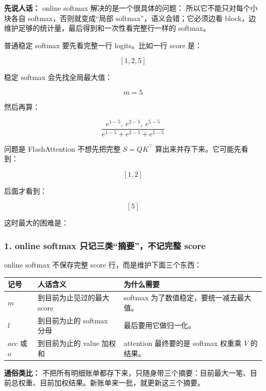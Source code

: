 \begin{conceptbox}
\textbf{先说人话：} online softmax 解决的是一个很具体的问题： 所以它不能只对每个小块各自 softmax，否则就变成“局部 softmax”，语义会错；它必须边看 block，边维护足够的统计量，最后得到和一次性看完整行一样的 softmax。
\end{conceptbox}

普通稳定 softmax 要先看完整一行 logits。比如一行 score 是：

\[
[1,2,5]
\]

稳定 softmax 会先找全局最大值：

\[
m=5
\]

然后再算：

\[
\frac{e^{1-5},\ e^{2-5},\ e^{5-5}}{e^{1-5}+e^{2-5}+e^{5-5}}
\]

问题是 FlashAttention 不想先把完整 $S=QK^\top$ 算出来并存下来。它可能先看到：

\[
[1,2]
\]

后面才看到：

\[
[5]
\]

这时最大的困难是：

\subsubsection*{1. online softmax 只记三类“摘要”，不记完整 score}

online softmax 不保存完整 score 行，而是维护下面三个东西：

\begin{center}
{\small
\begin{tabular}{p{2.0cm}p{4.7cm}p{5.8cm}}
\hline
\textbf{记号} & \textbf{人话含义} & \textbf{为什么需要} \\
\hline
$m$ & 到目前为止见过的最大 score & softmax 为了数值稳定，要统一减去最大值。 \\
$l$ & 到目前为止的 softmax 分母 & 最后要用它做归一化。 \\
$acc$ 或 $o$ & 到目前为止的 value 加权和 & attention 最终要的是 softmax 权重乘 $V$ 的结果。 \\
\hline
\end{tabular}
}
\end{center}

\begin{intubox}
\textbf{通俗类比：} 不把所有明细账单都存下来，只随身带三个摘要：目前最大一笔、目前总权重、目前加权结果。新账单来一批，就更新这三个摘要。
\end{intubox}

